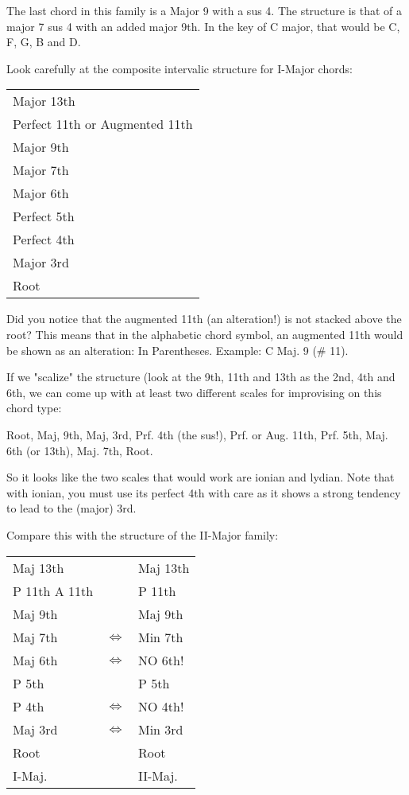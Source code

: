 The last chord in this family is a Major 9 with a sus 4. The structure 
is that of a major 7 sus 4 with an added major 9th. In the key of C major, 
that would be C, F, G, B and D.

Look carefully at the composite intervalic structure for I-Major chords:
\begin{center}
\begin{tabular}{ | l | }
  \hline
  Major 13th\\
  Perfect 11th or Augmented 11th\\
  Major 9th\\
  Major 7th\\
  Major 6th\\
  Perfect 5th\\
  Perfect 4th\\
  Major 3rd\\
  \hline
  Root\\
  \hline
\end{tabular}
\end{center}

Did you notice that the augmented 11th (an alteration!) is not stacked 
above the root? This means that in the alphabetic chord symbol, an 
augmented 11th would be shown as an alteration: In Parentheses. Example:
C Maj. 9 (\# 11).

If we "scalize" the structure (look at the 9th, 11th and 13th as the 2nd, 
4th and 6th, we can come up with at least two different scales for 
improvising on this chord type:

Root, Maj, 9th, Maj, 3rd, Prf. 4th (the sus!), Prf. or Aug. 11th, 
Prf. 5th, Maj. 6th (or 13th), Maj. 7th, Root. %

So it looks like the two scales that would work are ionian and lydian. 
Note that with ionian, you must use its perfect 4th with care as it shows 
a strong tendency to lead to the (major) 3rd.

Compare this with the structure of the II-Major family:

\begin{center}
\begin{tabular}{ | l c l | }
	\hline
	Maj 13th					&					& Maj 13th				\\
	P 11th   A 11th   & 				& P 11th					\\
	Maj 9th           & 				& Maj 9th					\\
	Maj 7th    				& $\iff$	& Min 7th					\\
	Maj 6th						& $\iff$	& NO 6th!					\\
	P 5th             & 				& P 5th						\\
	P 4th							& $\iff$	& NO 4th!					\\
	Maj 3rd						& $\iff$	& Min 3rd					\\
	Root              & 				& Root						\\
	\hline
  I-Maj.            & 				& II-Maj.					\\
  \hline
\end{tabular}
\end{center}

